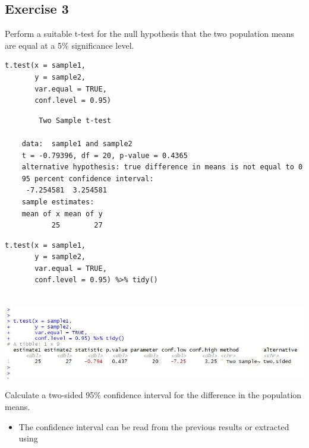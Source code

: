 \documentclass[a4paper,12pt]{article}
\begin{document}
\subsection*{Exercise 3}

\noindent Perform a suitable t-test for the null hypothesis that the two population
means are equal at a 5\% significance level.



\begin{framed}\begin{verbatim}
t.test(x = sample1, 
       y = sample2, 
       var.equal = TRUE, 
       conf.level = 0.95)
\end{verbatim}\end{framed}


\begin{verbatim}
    	Two Sample t-test
    
    data:  sample1 and sample2
    t = -0.79396, df = 20, p-value = 0.4365
    alternative hypothesis: true difference in means is not equal to 0
    95 percent confidence interval:
     -7.254581  3.254581
    sample estimates:
    mean of x mean of y 
           25        27  
\end{verbatim}   

\newpage 



\begin{framed}\begin{verbatim}
t.test(x = sample1, 
       y = sample2, 
       var.equal = TRUE, 
       conf.level = 0.95) %>% tidy()


\end{verbatim}\end{framed}


\includegraphics[]{00-A1/images/A1-Q4-Broom2.JPG}


\newpage 
\noindent Calculate a two-sided 95\% confidence interval for the difference in the
population means.



\begin{itemize}
    \item The confidence interval can be read from the previous results or extracted using
\end{itemize}
\end{document}
